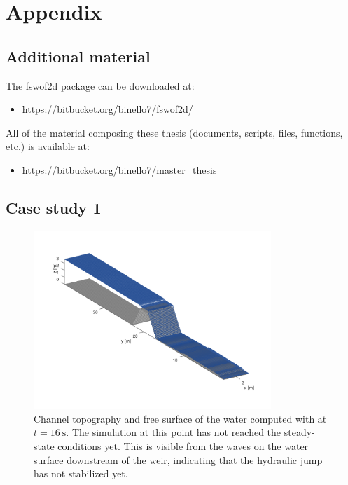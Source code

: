 \chapter{Appendix}


\section{Additional material}\label{sec:additional_material}
\noindent The  fswof2d package can be downloaded at:
\begin{itemize}
\itemsep0em
  \item \url{https://bitbucket.org/binello7/fswof2d/}
\end{itemize}

\noindent All of the material composing these thesis (documents, scripts, files, functions, etc.) is available at:
\begin{itemize}
\itemsep0em
  \item \url{https://bitbucket.org/binello7/master_thesis}
\end{itemize}



\section{Case study 1}
\begin{figure}[H]
  \centering
  \includegraphics[width=0.8\textwidth]{Figures/channel.png}
  \caption{Channel topography and free surface of the water computed with  at $t = \SI{16}{\s}$. The simulation at this point has not reached the steady-state conditions yet. This is visible from the waves on the water surface downstream of the weir, indicating that the hydraulic jump has not stabilized yet.}
  \label{fig:channel}
\end{figure}


